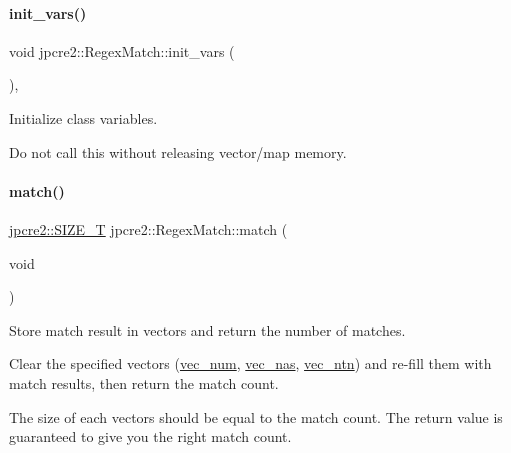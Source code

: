 \paragraph{\texorpdfstring{init\+\_\+vars()}{init\_vars()}}
{\footnotesize\ttfamily void jpcre2\+::\+Regex\+Match\+::init\+\_\+vars (\begin{DoxyParamCaption}{ }\end{DoxyParamCaption})\hspace{0.3cm}{\ttfamily [inline]}, {\ttfamily [private]}}



Initialize class variables. 

Do not call this without releasing vector/map memory. \hypertarget{classjpcre2_1_1RegexMatch_a5868aef3a146594ea1ebef34d122bb33_a5868aef3a146594ea1ebef34d122bb33}{}\label{classjpcre2_1_1RegexMatch_a5868aef3a146594ea1ebef34d122bb33_a5868aef3a146594ea1ebef34d122bb33} 
\paragraph{\texorpdfstring{match()}{match()}}
{\footnotesize\ttfamily \hyperlink{namespacejpcre2_a2aac465ddcb123560c7c8215dd69246c}{jpcre2\+::\+S\+I\+Z\+E\+\_\+T} jpcre2\+::\+Regex\+Match\+::match (\begin{DoxyParamCaption}\item[{void}]{ }\end{DoxyParamCaption})}



Store match result in vectors and return the number of matches. 

Clear the specified vectors (\hyperlink{classjpcre2_1_1RegexMatch_a836705e0444568c78abaab4c8e351335}{vec\+\_\+num}, \hyperlink{classjpcre2_1_1RegexMatch_a812b57dc08fdc0caa93a1b508ef8242c}{vec\+\_\+nas}, \hyperlink{classjpcre2_1_1RegexMatch_a86ef413ab6d237972af858be26ff77f7}{vec\+\_\+ntn}) and re-\/fill them with match results, then return the match count.

The size of each vectors should be equal to the match count. The return value is guaranteed to give you the right match count.

